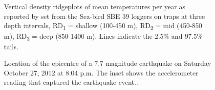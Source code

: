 \documentclass[12pt]{article}\usepackage[]{graphicx}\usepackage[]{color}
\begin{document}
\begin{figure}[htb]

{\centering {} 

}

\caption{Vertical density ridgeplots of mean temperatures per year as reported by set from the Sea-bird SBE 39 loggers on traps at three depth intervals, RD\textsubscript{1} = shallow (100-450 m), RD\textsubscript{2} = mid (450-850 m), RD\textsubscript{3} = deep (850-1400 m). Lines indicate the 2.5\% and 97.5\% tails.}\label{fig:figure14}
\end{figure}
\clearpage

\clearpage


\begin{figure}[htb]

{\centering {} 

}

\caption{Location of the epicentre of a 7.7 magnitude earthquake on Saturday October 27, 2012 at 8:04 p.m. The inset shows the accelerometer reading that captured the earthquake event..}\label{fig:figure15}
\end{figure}
\clearpage
\end{document}

